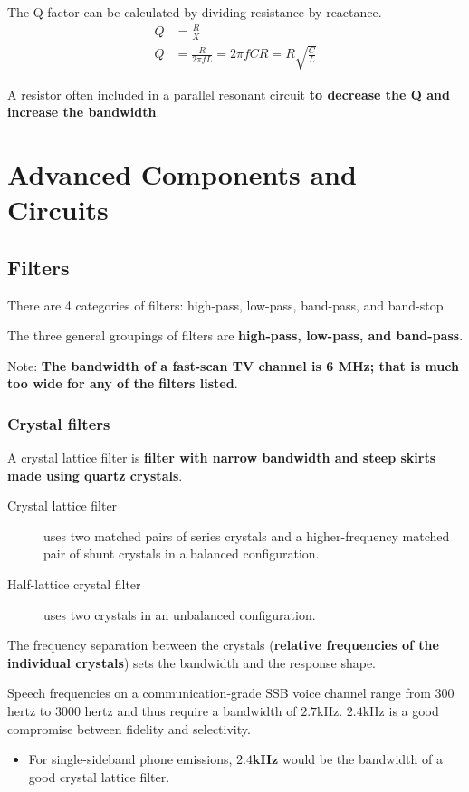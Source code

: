 \documentclass[letterpaper]{article}
\begin{document}
        The Q factor can be calculated by dividing resistance by reactance.
        \begin{align*}
            Q &= \frac{R}{X} \\
            Q &= \frac{R}{2 \pi f L} = 2 \pi f C R = R \sqrt{\frac{C}{L}}
        \end{align*}

        A resistor often included in a parallel resonant circuit \textbf{to decrease the Q and increase the bandwidth}.

    \newpage

    \section{Advanced Components and Circuits}
        \subsection{Filters}
        There are 4 categories of filters: high-pass, low-pass, band-pass, and band-stop.

        The three general groupings of filters are \textbf{high-pass, low-pass, and band-pass}.

        Note: \textbf{The bandwidth of a fast-scan TV channel is 6 MHz;  that is much too wide for any of the filters listed}.

        \subsubsection{Crystal filters}
        A crystal lattice filter is \textbf{filter with narrow bandwidth and steep skirts made using quartz crystals}.

        \begin{description}
            \item[Crystal lattice filter] uses two matched pairs of series crystals and a higher-frequency matched pair of shunt crystals in a balanced configuration.
            \item[Half-lattice crystal filter] uses two crystals in an unbalanced configuration.
        \end{description}

        The frequency separation between the crystals (\textbf{relative frequencies of the individual crystals}) sets the bandwidth and the response shape.

        Speech frequencies on a communication-grade SSB voice channel range from 300 hertz to 3000 hertz and thus require a bandwidth of $ 2.7 \mathrm{kHz} $.
        $ 2.4 \mathrm{kHz} $ is a good compromise between fidelity and selectivity.
        \begin{itemize}
            \item For single-sideband phone emissions, $ \mathbf{2.4} \mathrm{\textbf{kHz}} $ would be the bandwidth of a good crystal lattice filter.
        \end{itemize}
\end{document}
